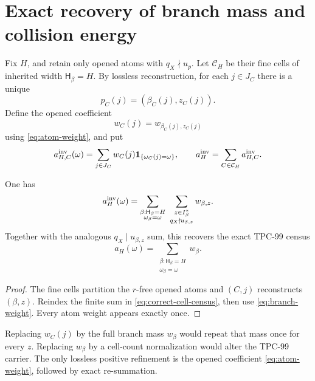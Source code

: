 \section{Exact recovery of branch mass and collision energy}
\label{sec:collision-energy}

Fix \(H\), and retain only opened atoms with \(q_X\nmid u_p\).
Let \(\mathcal C_H\) be their fine cells of inherited width
\(\mathsf H_\beta=H\).  By lossless reconstruction, for each
\(j\in J_C\) there is a unique
\[
 p_C(j)=(\beta_C(j),z_C(j)).
\]
Define the opened coefficient
\begin{equation}
 w_C(j)
 =
 w_{\beta_C(j),z_C(j)}
\label{eq:correct-cell-weight}
\end{equation}
using \eqref{eq:atom-weight}, and put
\begin{equation}
 a^{\rm inv}_{H,C}(\omega)
 =
 \sum_{j\in J_C}
 w_C(j)\mathbf 1_{\{\omega_C(j)=\omega\}},
\qquad
 a_H^{\rm inv}=\sum_{C\in\mathcal C_H}a^{\rm inv}_{H,C}.
\label{eq:correct-cell-census}
\end{equation}

\begin{proposition}
\label{prop:branch-census-return}
One has
\begin{align}
 a_H^{\rm inv}(\omega)
 =
 \sum_{\substack{\beta:\mathsf H_\beta=H\\\omega_\beta=\omega}}
 \ \sum_{\substack{z\in I_\beta^\ast\\q_X\nmid u_{\beta,z}}}
 w_{\beta,z}.
\label{eq:invertible-branch-census}
\end{align}
Together with the analogous \(q_X\mid u_{\beta,z}\) sum, this
recovers the exact TPC-99 census
\[
 a_H(\omega)
 =
 \sum_{\substack{\beta:\mathsf H_\beta=H\\\omega_\beta=\omega}}w_\beta.
\]
\end{proposition}

\begin{proof}
The fine cells partition the \(r\)-free opened atoms and
\((C,j)\) reconstructs \((\beta,z)\).  Reindex the finite sum in
\eqref{eq:correct-cell-census}, then use
\eqref{eq:branch-weight}.  Every atom weight appears exactly once.
\end{proof}

\begin{remark}
Replacing \(w_C(j)\) by the full branch mass \(w_\beta\) would repeat
that mass once for every \(z\).  Replacing \(w_\beta\) by a
cell-count normalization would alter the TPC-99 carrier.  The only
lossless positive refinement is the opened coefficient
\eqref{eq:atom-weight}, followed by exact re-summation.
\end{remark}

